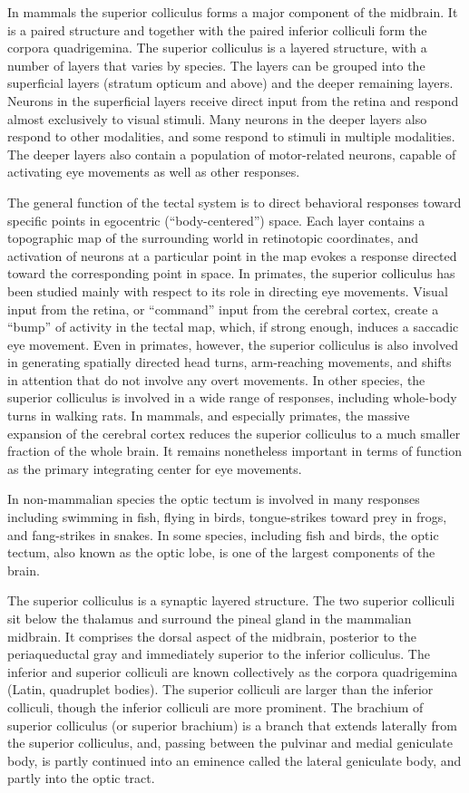 In mammals the superior colliculus forms a major component of the midbrain. It is a paired structure and together with the paired inferior colliculi form the corpora quadrigemina. The superior colliculus is a layered structure, with a number of layers that varies by species. The layers can be grouped into the superficial layers (stratum opticum and above) and the deeper remaining layers. Neurons in the superficial layers receive direct input from the retina and respond almost exclusively to visual stimuli. Many neurons in the deeper layers also respond to other modalities, and some respond to stimuli in multiple modalities. The deeper layers also contain a population of motor-related neurons, capable of activating eye movements as well as other responses.

The general function of the tectal system is to direct behavioral responses toward specific points in egocentric (``body-centered'') space. Each layer contains a topographic map of the surrounding world in retinotopic coordinates, and activation of neurons at a particular point in the map evokes a response directed toward the corresponding point in space. In primates, the superior colliculus has been studied mainly with respect to its role in directing eye movements. Visual input from the retina, or ``command'' input from the cerebral cortex, create a ``bump'' of activity in the tectal map, which, if strong enough, induces a saccadic eye movement. Even in primates, however, the superior colliculus is also involved in generating spatially directed head turns, arm-reaching movements, and shifts in attention that do not involve any overt movements. In other species, the superior colliculus is involved in a wide range of responses, including whole-body turns in walking rats. In mammals, and especially primates, the massive expansion of the cerebral cortex reduces the superior colliculus to a much smaller fraction of the whole brain. It remains nonetheless important in terms of function as the primary integrating center for eye movements.

In non-mammalian species the optic tectum is involved in many responses including swimming in fish, flying in birds, tongue-strikes toward prey in frogs, and fang-strikes in snakes. In some species, including fish and birds, the optic tectum, also known as the optic lobe, is one of the largest components of the brain.

The superior colliculus is a synaptic layered structure. The two superior colliculi sit below the thalamus and surround the pineal gland in the mammalian midbrain. It comprises the dorsal aspect of the midbrain, posterior to the periaqueductal gray and immediately superior to the inferior colliculus. The inferior and superior colliculi are known collectively as the corpora quadrigemina (Latin, quadruplet bodies). The superior colliculi are larger than the inferior colliculi, though the inferior colliculi are more prominent. The brachium of superior colliculus (or superior brachium) is a branch that extends laterally from the superior colliculus, and, passing between the pulvinar and medial geniculate body, is partly continued into an eminence called the lateral geniculate body, and partly into the optic tract.

